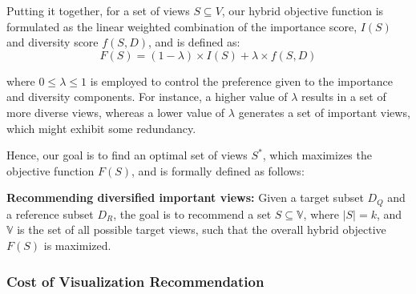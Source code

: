 %
Putting it together, for a set of views $S \subseteq V$, our hybrid objective function is formulated as the linear weighted combination of the importance score, $ I\left(S\right) $ and diversity score $ f\left(S,D\right) $, and is defined as:
\begin{equation}
F\left(S\right) =  \left(1-\lambda\right) \times I\left(S\right) + \lambda \times f\left(S,D\right)
\label{objectif_function}
\end{equation}

where $ 0 \leq \lambda \leq 1 $  is employed to control the preference given to the importance and diversity components. 
%
For instance, a higher value of $  \lambda $ results in a set of more diverse views, whereas a lower value of $ \lambda $ generates a set of important views, which might exhibit some redundancy. 
%

Hence, our goal is to find an optimal set of views  $ S^* $, which maximizes the objective function $ F\left(S\right) $, and is formally defined as follows:
\begin{definition} 
{\bf Recommending diversified important views:} Given a target subset $D_Q$  and a reference subset $D_R$, the goal is to recommend a set $S \subseteq \mathbb{V}$, where $|S| = k$, and $\mathbb{V}$ is the set of all possible target views, such that the overall hybrid objective $ F\left(S\right) $ is maximized. 
\end{definition} 

%





\subsubsection{Cost of Visualization Recommendation}

